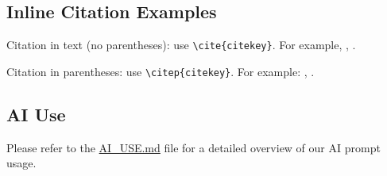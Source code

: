 \documentclass[12pt,letterpaper]{article}
\begin{document}
\subsection{Inline Citation Examples}

Citation in text (no parentheses): use \texttt{{\textbackslash}cite\{citekey\}}. 
For example, \cite{breiman2011}, \cite{devlin2019bert}.

Citation in parentheses: use \texttt{{\textbackslash}citep\{citekey\}}. 
For example: \citep{vaswani2023attention}, \citep{karras2019stylebased}.

\fi



\makereference






\clearpage
\makeappendix

\subsection{AI Use}
Please refer to the \href{https://github.com/randonDsc/drone_final_project1/blob/main/AI_USE.md}{AI\_USE.md} file for a detailed overview of our AI prompt usage.



\end{document}
